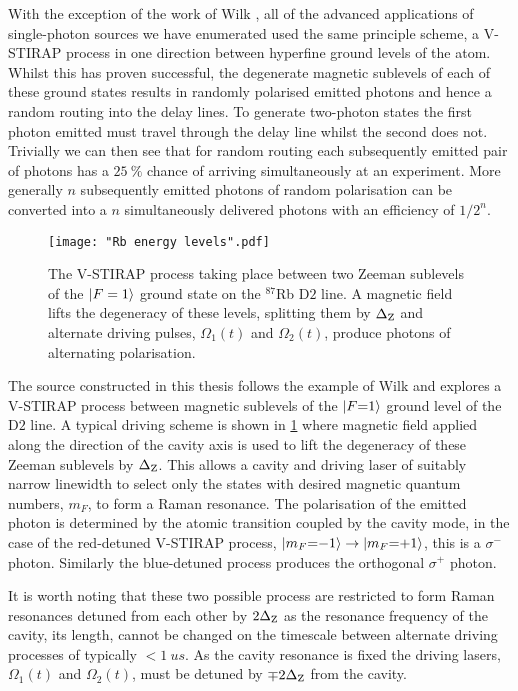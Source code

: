 \documentclass[../Thesis-IJspeert.tex]{subfiles}
\begin{document}
With the exception of the work of Wilk \etal{} \cite{wilk07,wilk07b}, all of the advanced applications of single-photon sources we have enumerated used the same principle scheme, a V-STIRAP process in one direction between hyperfine ground levels of the atom.  Whilst this has proven successful, the degenerate magnetic sublevels of each of these ground states results in randomly polarised emitted photons and hence a random routing into the delay lines.  To generate two-photon states the first photon emitted must travel through the delay line whilst the second does not.  Trivially we can then see that for random routing each subsequently emitted pair of photons has a $\SI{25}{\%}$ chance of arriving simultaneously at an experiment. More generally $n$ subsequently emitted photons of random polarisation can be converted into a $n$ simultaneously delivered photons with an efficiency of $1/2^{n}$.

\begin{figure}[t] 
   \centering
   \texttt{[image: "Rb energy levels".pdf]}
   \caption[V-STIRAP process between sublevels of the \Rb{} $\mathrm{D}2${} line.]{The V-STIRAP process taking place between two Zeeman sublevels of the $\ket{F=1}$ ground state on the $^{87}$Rb $\mathrm{D}2${} line.  A magnetic field lifts the degeneracy of these levels, splitting them by $\Delta_{\mathrm{Z}}$ and alternate driving pulses, $\Omega_{1}(t)$ and $\Omega_{2}(t)$, produce photons of alternating polarisation.}
   \label{fig:STIRAPlevelsRb}
\end{figure}

The source constructed in this thesis follows the example of Wilk \etal{} and explores a V-STIRAP process between magnetic sublevels of the $\ket{F{=}1}$ ground level of the \Rb{} $\mathrm{D}2${} line.  A typical driving scheme is shown in \cref{fig:STIRAPlevelsRb} where magnetic field applied along the direction of the cavity axis is used to lift the degeneracy of these Zeeman sublevels by $\Delta_{\mathrm{Z}}$.  This allows a cavity and driving laser of suitably narrow linewidth to select only the states with desired magnetic quantum numbers, $m_F$, to form a Raman resonance.  The polarisation of the emitted photon is determined by the atomic transition coupled by the cavity mode, in the case of the red-detuned V-STIRAP process, $\ket{m_F{=}{-}1} \rightarrow \ket{m_F{=}{+}1}$, this is a $\sigma^-$ photon.  Similarly the blue-detuned process produces the orthogonal $\sigma^+$ photon.

It is worth noting that these two possible process are restricted to form Raman resonances detuned from each other by $2\Delta_{\mathrm{Z}}$ as the resonance frequency of the cavity, \ie{} its length, cannot be  changed on the timescale between alternate driving processes of typically $< \SI{1}{us}$.  As the cavity resonance is fixed the driving lasers, $\Omega_{1}(t)$ and $\Omega_{2}(t)$, must be detuned by $\mp 2\Delta_{\mathrm{Z}}$ from the cavity.
\end{document}
